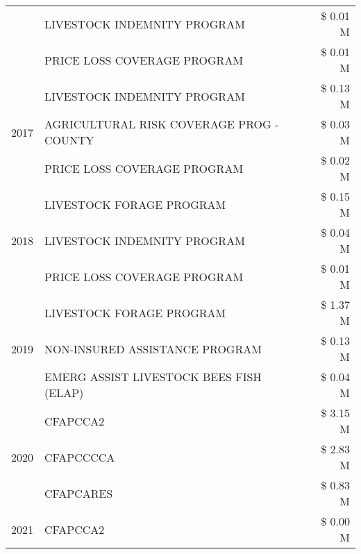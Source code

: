 \begin{tabular}{llr}
 & LIVESTOCK INDEMNITY PROGRAM & \$ 0.01 M \\
 & PRICE LOSS COVERAGE PROGRAM & \$ 0.01 M \\
\cline{1-3}
\multirow[t]{3}{*}{2017} & LIVESTOCK INDEMNITY PROGRAM & \$ 0.13 M \\
 & AGRICULTURAL RISK COVERAGE PROG - COUNTY & \$ 0.03 M \\
 & PRICE LOSS COVERAGE PROGRAM & \$ 0.02 M \\
\cline{1-3}
\multirow[t]{3}{*}{2018} & LIVESTOCK FORAGE PROGRAM & \$ 0.15 M \\
 & LIVESTOCK INDEMNITY PROGRAM & \$ 0.04 M \\
 & PRICE LOSS COVERAGE PROGRAM & \$ 0.01 M \\
\cline{1-3}
\multirow[t]{3}{*}{2019} & LIVESTOCK FORAGE PROGRAM & \$ 1.37 M \\
 & NON-INSURED ASSISTANCE PROGRAM & \$ 0.13 M \\
 & EMERG ASSIST LIVESTOCK BEES FISH (ELAP) & \$ 0.04 M \\
\cline{1-3}
\multirow[t]{3}{*}{2020} & CFAPCCA2 & \$ 3.15 M \\
 & CFAPCCCCA & \$ 2.83 M \\
 & CFAPCARES & \$ 0.83 M \\
\cline{1-3}
2021 & CFAPCCA2 & \$ 0.00 M \\
\cline{1-3}
\bottomrule
\end{tabular}
